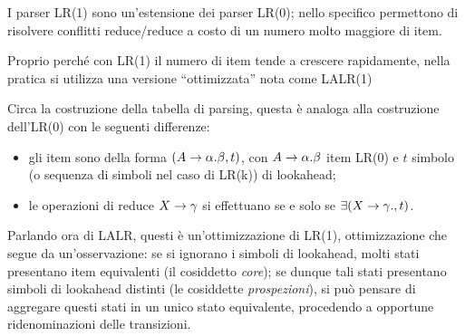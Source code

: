 \documentclass{subfiles}
\begin{document}
I parser LR(1) sono un'estensione dei parser LR(0); nello specifico permettono di risolvere conflitti reduce/reduce a costo di un numero molto maggiore di item.

\begin{Remark*}
    Proprio perché con LR(1) il numero di item tende a crescere rapidamente, nella pratica si utilizza una versione ``ottimizzata'' nota come LALR(1)
\end{Remark*}

Circa la costruzione della tabella di parsing, questa è analoga alla costruzione dell'LR(0) con le seguenti differenze:
\begin{itemize}
    \item gli item sono della forma $(\Grammar{A}{\alpha . \beta}, t)$,
          con $\Grammar{A}{\alpha . \beta}$ item LR(0) e $t$ simbolo (o sequenza di simboli nel caso di LR(k)) di lookahead;

    \item le operazioni di reduce $\Grammar{X}{\gamma}$ si effettuano se e solo se $\exists (\Grammar{X}{\gamma.}, t)$.
\end{itemize}

Parlando ora di LALR, questi è un'ottimizzazione di LR(1), ottimizzazione che segue da un'osservazione: se si ignorano i simboli di lookahead,
molti stati presentano item equivalenti (il cosiddetto \emph{core}); se dunque tali stati presentano simboli di lookahead distinti (le cosiddette \emph{prospezioni}),
si può pensare di aggregare questi stati in un unico stato equivalente, procedendo a opportune ridenominazioni delle transizioni.
\end{document}
